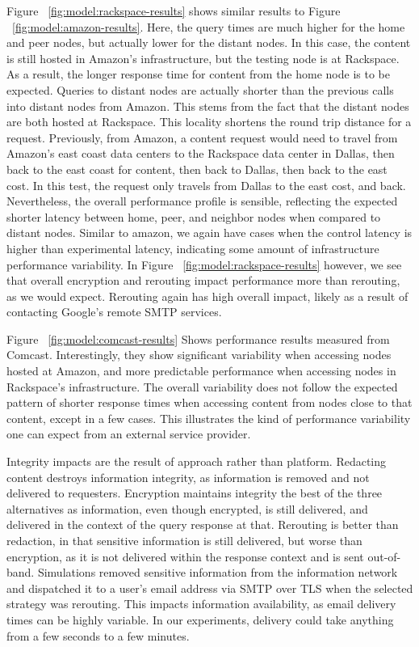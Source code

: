 Figure ~\ref{fig:model:rackspace-results} shows similar results to Figure ~\ref{fig:model:amazon-results}.  Here, the query times are much higher for the home and peer nodes, but actually lower for the distant nodes.  In this case, the content is still hosted in Amazon's infrastructure, but the testing node is at Rackspace.  As a result, the longer response time for content from the home node is to be expected.  Queries to distant nodes are actually shorter than the previous calls into distant nodes from Amazon.  This stems from the fact that the distant nodes are both hosted at Rackspace.  This locality shortens the round trip distance for a request.  Previously, from Amazon, a content request would need to travel from Amazon's east coast data centers to the Rackspace data center in Dallas, then back to the east coast for content, then back to Dallas, then back to the east cost.  In this test, the request only travels from Dallas to the east cost, and back.  Nevertheless, the overall performance profile is sensible, reflecting the expected shorter latency between home, peer, and neighbor nodes when compared to distant nodes.  Similar to amazon, we again have cases when the control latency is higher than experimental latency, indicating some amount of infrastructure performance variability.  In Figure ~\ref{fig:model:rackspace-results} however, we see that overall encryption and rerouting impact performance more than rerouting, as we would expect.  Rerouting again has high overall impact, likely as a result of contacting Google's remote SMTP services.

Figure ~\ref{fig:model:comcast-results} Shows performance results measured from Comcast.  Interestingly, they show significant variability when accessing nodes hosted at Amazon, and more predictable performance when accessing nodes in Rackspace's infrastructure.  The overall variability does not follow the expected pattern of shorter response times when accessing content from nodes close to that content, except in a few cases.  This illustrates the kind of performance variability one can expect from an external service provider.

Integrity impacts are the result of approach rather than platform.  Redacting content destroys information integrity, as information is removed and not delivered to requesters.  Encryption maintains integrity the best of the three alternatives as information, even though encrypted, is still delivered, and delivered in the context of the query response at that.  Rerouting is better than redaction, in that sensitive information is still delivered, but worse than encryption, as it is not delivered within the response context and is sent out-of-band. Simulations removed sensitive information from the information network and dispatched it to a user's email address via SMTP over TLS when the selected strategy was rerouting.  This impacts information availability, as email delivery times can be highly variable.  In our experiments, delivery could take anything from a few seconds to a few minutes.

